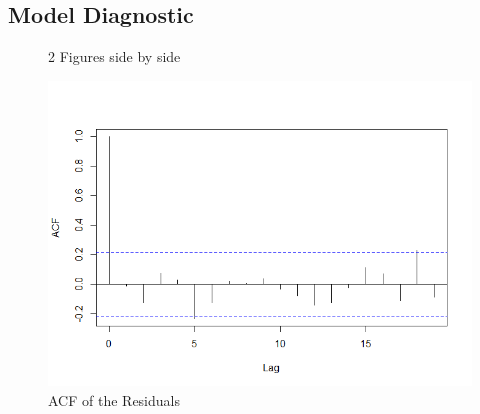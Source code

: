 \documentclass[12pt, centerh1]{article}
\begin{document}
\subsection{Model Diagnostic}

\begin{figure}[H]%
    \centering
    \qquad
    \caption{2 Figures side by side}%
    \label{fig:res}%
\end{figure}

\begin{figure}[H]
    \centering
    \includegraphics[scale=0.5]{imgs/acf_res.png}
    \caption{ACF of the Residuals}
    \label{fig:acf_res}
\end{figure}
\end{document}
